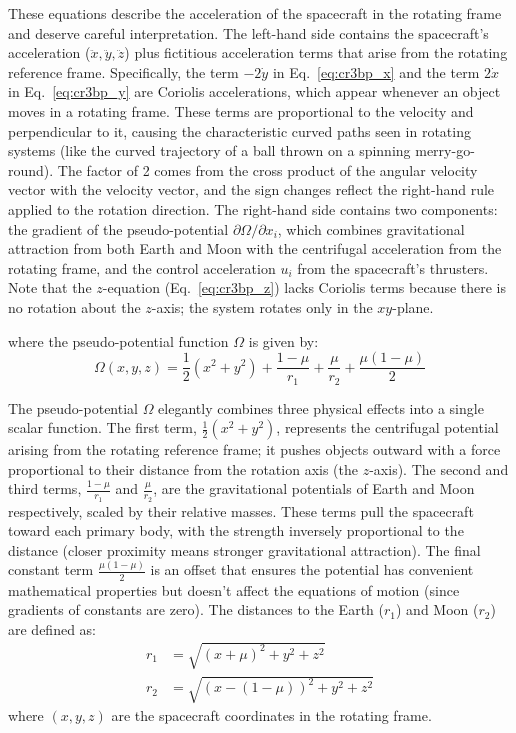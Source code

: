 \documentclass[10pt,letterpaper]{article}
\begin{document}
These equations describe the acceleration of the spacecraft in the rotating frame and deserve careful interpretation. The left-hand side contains the spacecraft's acceleration ($\ddot{x}, \ddot{y}, \ddot{z}$) plus fictitious acceleration terms that arise from the rotating reference frame. Specifically, the term $-2\dot{y}$ in Eq.~\ref{eq:cr3bp_x} and the term $2\dot{x}$ in Eq.~\ref{eq:cr3bp_y} are Coriolis accelerations, which appear whenever an object moves in a rotating frame. These terms are proportional to the velocity and perpendicular to it, causing the characteristic curved paths seen in rotating systems (like the curved trajectory of a ball thrown on a spinning merry-go-round). The factor of 2 comes from the cross product of the angular velocity vector with the velocity vector, and the sign changes reflect the right-hand rule applied to the rotation direction. The right-hand side contains two components: the gradient of the pseudo-potential $\partial \Omega / \partial x_i$, which combines gravitational attraction from both Earth and Moon with the centrifugal acceleration from the rotating frame, and the control acceleration $u_i$ from the spacecraft's thrusters. Note that the $z$-equation (Eq.~\ref{eq:cr3bp_z}) lacks Coriolis terms because there is no rotation about the $z$-axis; the system rotates only in the $xy$-plane.

where the pseudo-potential function $\Omega$ is given by:
\begin{equation}
    \Omega(x, y, z) = \frac{1}{2}(x^2 + y^2) + \frac{1-\mu}{r_1} + \frac{\mu}{r_2} + \frac{\mu(1-\mu)}{2} \label{eq:pseudopotential}
\end{equation}

The pseudo-potential $\Omega$ elegantly combines three physical effects into a single scalar function. The first term, $\frac{1}{2}(x^2 + y^2)$, represents the centrifugal potential arising from the rotating reference frame; it pushes objects outward with a force proportional to their distance from the rotation axis (the $z$-axis). The second and third terms, $\frac{1-\mu}{r_1}$ and $\frac{\mu}{r_2}$, are the gravitational potentials of Earth and Moon respectively, scaled by their relative masses. These terms pull the spacecraft toward each primary body, with the strength inversely proportional to the distance (closer proximity means stronger gravitational attraction). The final constant term $\frac{\mu(1-\mu)}{2}$ is an offset that ensures the potential has convenient mathematical properties but doesn't affect the equations of motion (since gradients of constants are zero). The distances to the Earth ($r_1$) and Moon ($r_2$) are defined as:
\begin{align}
    r_1 &= \sqrt{(x + \mu)^2 + y^2 + z^2} \label{eq:r1}\\
    r_2 &= \sqrt{(x - (1-\mu))^2 + y^2 + z^2} \label{eq:r2}
\end{align}
where $(x,y,z)$ are the spacecraft coordinates in the rotating frame.
\end{document}
